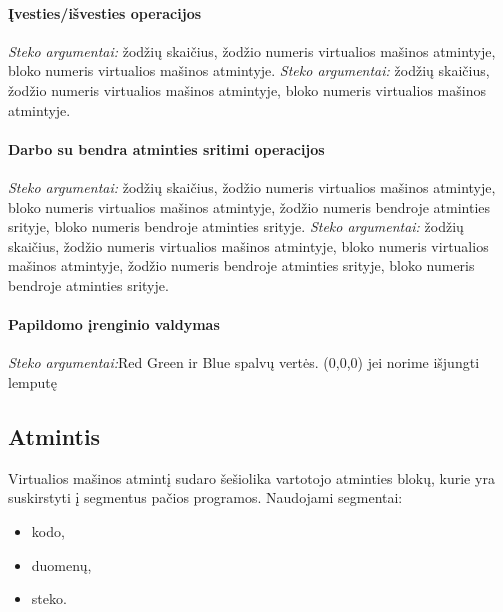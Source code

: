 \documentclass{scrartcl}
\begin{document}
                \paragraph{Įvesties/išvesties operacijos}
                    \emph{Steko argumentai:} žodžių skaičius, žodžio numeris virtualios mašinos atmintyje, bloko numeris virtualios mašinos atmintyje.
                    \emph{Steko argumentai:} žodžių skaičius, žodžio numeris virtualios mašinos atmintyje, bloko numeris virtualios mašinos atmintyje.
                \paragraph{Darbo su bendra atminties sritimi operacijos}
                    \emph{Steko argumentai:} žodžių skaičius, žodžio numeris virtualios mašinos atmintyje, bloko numeris virtualios mašinos atmintyje, žodžio numeris bendroje atminties srityje, bloko numeris bendroje atminties srityje.
                    \emph{Steko argumentai:} žodžių skaičius, žodžio numeris virtualios mašinos atmintyje, bloko numeris virtualios mašinos atmintyje, žodžio numeris bendroje atminties srityje, bloko numeris bendroje atminties srityje.
                \paragraph{Papildomo įrenginio valdymas}
					\emph{Steko argumentai:}{Red Green ir Blue spalvų vertės. (0,0,0) jei norime išjungti lemputę}
        \subsection{Atmintis}
            Virtualios mašinos atmintį sudaro šešiolika vartotojo atminties blokų, kurie yra suskirstyti į segmentus pačios programos. Naudojami segmentai:
            \begin{itemize}
                \item kodo,
                \item duomenų,
                \item steko.
            \end{itemize}
\end{document}
